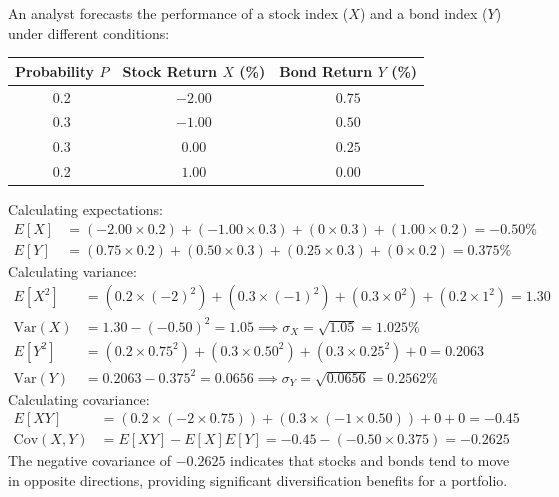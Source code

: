 \begin{tcolorbox}[
	colback=gray!5!white,
	colframe=black!15!white,
	boxrule=0.5pt,
	arc=3pt,
	title=\textbf{Case Study: Unconditional Mean, Variance, and Covariances of Two Assets},
	coltitle=black,
	colbacktitle=black!5!white,
	before skip=6pt,
	after skip=6pt,
	breakable
]
An analyst forecasts the performance of a stock index ($X$) and a bond index ($Y$) under different conditions:
\begin{center}
\begin{tabular}{c c c}
\toprule
\textbf{Probability} $P$ & \textbf{Stock Return} $X$ (\%) & \textbf{Bond Return} $Y$ (\%) \\
\midrule
0.2 & $-2.00$ & $0.75$ \\
0.3 & $-1.00$ & $0.50$ \\
0.3 & $0.00$  & $0.25$ \\
0.2 & $1.00$  & $0.00$ \\
\bottomrule
\end{tabular}
\end{center}
Calculating expectations:
\begin{align*}
	E[X] &= (-2.00 \times 0.2) + (-1.00 \times 0.3) + (0 \times 0.3) + (1.00 \times 0.2) = -0.50\% \\
	E[Y] &= (0.75 \times 0.2) + (0.50 \times 0.3) + (0.25 \times 0.3) + (0 \times 0.2) = 0.375\%
\end{align*}
Calculating variance:
\begin{align*}
	E[X^2] &= (0.2 \times (-2)^2) + (0.3 \times (-1)^2) + (0.3 \times 0^2) + (0.2 \times 1^2) = 1.30 \\
	\text{Var}(X) &= 1.30 - (-0.50)^2 = 1.05 \implies \sigma_X = \sqrt{1.05} = 1.025\% \\
	E[Y^2] &= (0.2 \times 0.75^2) + (0.3 \times 0.50^2) + (0.3 \times 0.25^2) + 0 = 0.2063 \\
	\text{Var}(Y) &= 0.2063 - 0.375^2 = 0.0656 \implies \sigma_Y = \sqrt{0.0656} = 0.2562\%
\end{align*}
Calculating covariance:
\begin{align*}
	E[XY] &= (0.2 \times (-2 \times 0.75)) + (0.3 \times (-1 \times 0.50)) + 0 + 0 = -0.45 \\
	\text{Cov}(X, Y) &= E[XY] - E[X]E[Y] = -0.45 - (-0.50 \times 0.375) = -0.2625
\end{align*}
The negative covariance of $-0.2625$ indicates that stocks and bonds tend to move in opposite directions, providing significant diversification benefits for a portfolio.
\end{tcolorbox}

